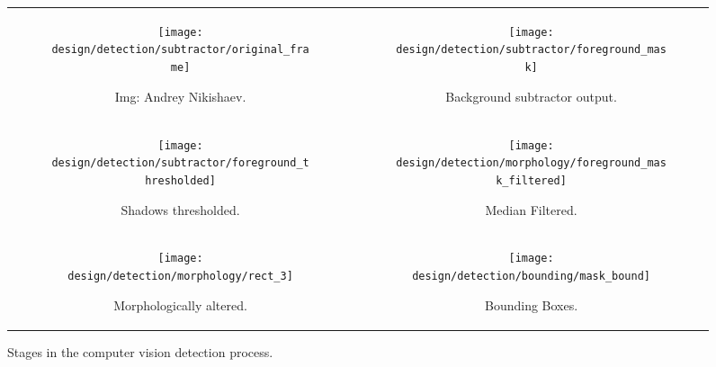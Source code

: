 \begin{figure*}[htbp]
    \begin{tabular}{c c}
        \begin{subfigure}[b]{0.45\textwidth}
            \texttt{[image: design/detection/subtractor/original\_frame]}
            \captionsetup{format = hang}
            \caption{Img: Andrey Nikishaev.}
            \label{fig:original_frame}
        \end{subfigure} & 
        \begin{subfigure}[b]{0.45\textwidth}
            \texttt{[image: design/detection/subtractor/foreground\_mask]}
            \captionsetup{format = hang}
            \caption{Background subtractor output.}
            \label{fig:foreground_mask_unfiltered}
        \end{subfigure} \\
        \begin{subfigure}[b]{0.45\textwidth}
            \texttt{[image: design/detection/subtractor/foreground\_thresholded]}
            \captionsetup{format = hang}
            \caption{Shadows thresholded.}
            \label{fig:thresh_shadow}
        \end{subfigure} &
        \begin{subfigure}[b]{0.45\textwidth}
            \texttt{[image: design/detection/morphology/foreground\_mask\_filtered]}
            \captionsetup{format = hang}
            \caption{Median Filtered.}
            \label{fig:mask_saltnpepper}
        \end{subfigure} \\
        \begin{subfigure}[b]{0.45\textwidth}
            \texttt{[image: design/detection/morphology/rect\_3]}
            \captionsetup{format = hang}
            \caption{Morphologically altered.}
            \label{fig:morphed}
        \end{subfigure} &
        \begin{subfigure}[b]{0.45\textwidth}
            \texttt{[image: design/detection/bounding/mask\_bound]}
            \captionsetup{format = hang}
            \caption{Bounding Boxes.}
            \label{fig:bounding_boxes}
        \end{subfigure}
    \end{tabular}
    \captionsetup{format=hang}
    \caption{Stages in the computer vision detection process.}
    \label{fig:example_subtraction}
\end{figure*}



